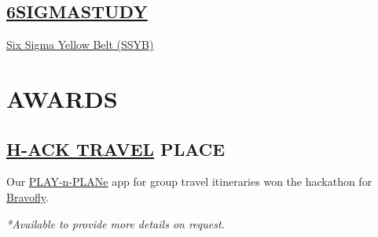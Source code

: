 \documentclass[]{deedy-resume-cv}
\begin{document}
\begin{minipage}[t]{0.35\textwidth}
\sectionsep

\subsection{\href{https://www.6sigmastudy.com/}{6SIGMASTUDY}}
\href{https://www.6sigmastudy.com/certification/verify?type=SSYB&number=909594}{Six Sigma Yellow Belt (SSYB)}

\section{AWARDS}

\subsection{\href{https://www.h-farm.com/it/nostri-eventi-hack}{H-ACK TRAVEL}  PLACE}
Our \href{https://drive.google.com/file/d/0B2vKVAUdRszZblFaNTQ2SnRiV3c/}{PLAY-n-PLANe} app for group travel itineraries won the hackathon for \href{https://www.bravofly.com/}{Bravofly}.

\vspace{3.5pt}
\small{\textit{*Available to provide more details on request.}}

\end{minipage}

%
%
\privacy
\end{document}
